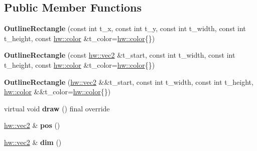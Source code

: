 \subsection*{Public Member Functions}
\begin{DoxyCompactItemize}
\item 
\mbox{\label{classdummy__api_1_1OutlineRectangle_ab5b37d809538082874c094edf0d04b39}} 
{\bfseries Outline\+Rectangle} (const int t\+\_\+x, const int t\+\_\+y, const int t\+\_\+width, const int t\+\_\+height, const \mbox{\hyperlink{structhw_1_1color}{hw\+::color}} \&t\+\_\+color=\mbox{\hyperlink{structhw_1_1color}{hw\+::color}}\{\})
\item 
\mbox{\label{classdummy__api_1_1OutlineRectangle_acc8b4a6b8afa9cd83d264f49fb712ece}} 
{\bfseries Outline\+Rectangle} (const \mbox{\hyperlink{structhw_1_1vec2}{hw\+::vec2}} \&t\+\_\+start, const int t\+\_\+width, const int t\+\_\+height, const \mbox{\hyperlink{structhw_1_1color}{hw\+::color}} \&t\+\_\+color=\mbox{\hyperlink{structhw_1_1color}{hw\+::color}}\{\})
\item 
\mbox{\label{classdummy__api_1_1OutlineRectangle_a0a97f7da9622b9f7d8086d7409c48fcd}} 
{\bfseries Outline\+Rectangle} (\mbox{\hyperlink{structhw_1_1vec2}{hw\+::vec2}} \&\&t\+\_\+start, const int t\+\_\+width, const int t\+\_\+height, \mbox{\hyperlink{structhw_1_1color}{hw\+::color}} \&\&t\+\_\+color=\mbox{\hyperlink{structhw_1_1color}{hw\+::color}}\{\})
\item 
\mbox{\label{classdummy__api_1_1OutlineRectangle_a0cb7e875238f749b6f55c1f2a7e40ef2}} 
virtual void {\bfseries draw} () final override
\item 
\mbox{\label{classdummy__api_1_1OutlineRectangle_a12bf7cb59049db0319100453f4216b59}} 
\mbox{\hyperlink{structhw_1_1vec2}{hw\+::vec2}} \& {\bfseries pos} ()
\item 
\mbox{\label{classdummy__api_1_1OutlineRectangle_ae17a886e37f776dc0473bc37ea5002a5}} 
\mbox{\hyperlink{structhw_1_1vec2}{hw\+::vec2}} \& {\bfseries dim} ()
\item 
\mbox{\label{classdummy__api_1_1OutlineRectangle_abac49b61e4992b0b97e65b07b4710e42}} 

\end{DoxyCompactItemize}
